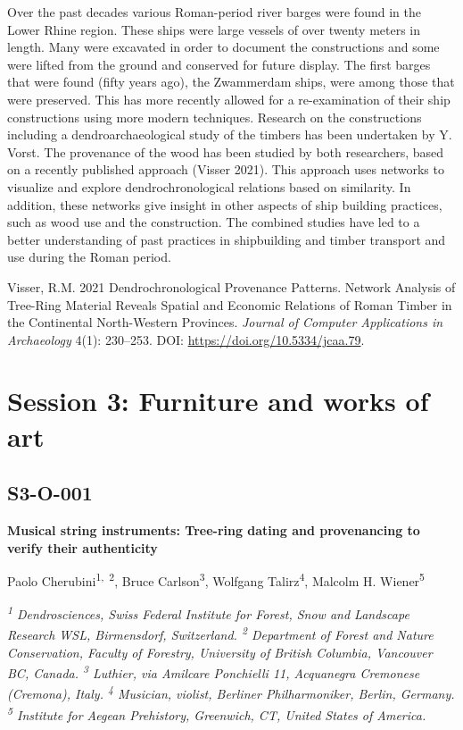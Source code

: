 \documentclass[
]{book}
\begin{document}
Over the past decades various Roman-period river barges were found in the Lower Rhine region. These ships were large vessels of over twenty meters in length. Many were excavated in order to document the constructions and some were lifted from the ground and conserved for future display. The first barges that were found (fifty years ago), the Zwammerdam ships, were among those that were preserved. This has more recently allowed for a re-examination of their ship constructions using more modern techniques. Research on the constructions including a dendroarchaeological study of the timbers has been undertaken by Y. Vorst. The provenance of the wood has been studied by both researchers, based on a recently published approach (Visser 2021). This approach uses networks to visualize and explore dendrochronological relations based on similarity. In addition, these networks give insight in other aspects of ship building practices, such as wood use and the construction. The combined studies have led to a better understanding of past practices in shipbuilding and timber transport and use during the Roman period.

Visser, R.M. 2021 Dendrochronological Provenance Patterns. Network Analysis of Tree-Ring Material Reveals Spatial and Economic Relations of Roman Timber in the Continental North-Western Provinces. \emph{Journal of Computer Applications in Archaeology} 4(1): 230--253. DOI: \url{https://doi.org/10.5334/jcaa.79}.

\hypertarget{session-3-furniture-and-works-of-art}{%
\chapter*{Session 3: Furniture and works of art}\label{session-3-furniture-and-works-of-art}}

\hypertarget{s3-o-001}{%
\section*{S3-O-001}\label{s3-o-001}}

\textbf{Musical string instruments: Tree-ring dating and provenancing to verify their authenticity}

Paolo Cherubini\textsuperscript{1,~2}, Bruce Carlson\textsuperscript{3}, Wolfgang Talirz\textsuperscript{4}, Malcolm H. Wiener\textsuperscript{5}

\emph{\textsuperscript{1} Dendrosciences, Swiss Federal Institute for Forest, Snow and Landscape Research WSL, Birmensdorf, Switzerland. \textsuperscript{2} Department of Forest and Nature Conservation, Faculty of Forestry, University of British Columbia, Vancouver BC, Canada. \textsuperscript{3} Luthier, via Amilcare Ponchielli 11, Acquanegra Cremonese (Cremona), Italy. \textsuperscript{4} Musician, violist, Berliner Philharmoniker, Berlin, Germany. \textsuperscript{5} Institute for Aegean Prehistory, Greenwich, CT, United States of America.}
\end{document}
